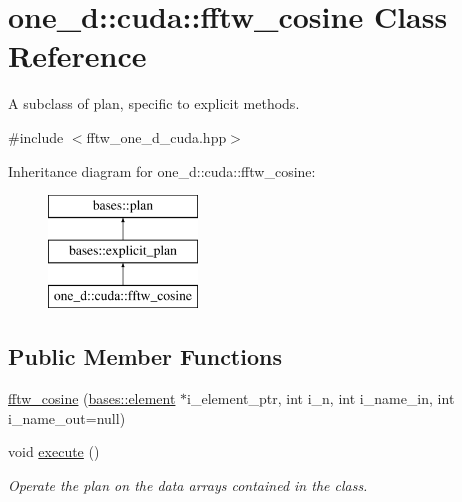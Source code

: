 \hypertarget{classone__d_1_1cuda_1_1fftw__cosine}{\section{one\-\_\-d\-:\-:cuda\-:\-:fftw\-\_\-cosine Class Reference}
\label{classone__d_1_1cuda_1_1fftw__cosine}
}


A subclass of plan, specific to explicit methods.  




{\ttfamily \#include $<$fftw\-\_\-one\-\_\-d\-\_\-cuda.\-hpp$>$}

Inheritance diagram for one\-\_\-d\-:\-:cuda\-:\-:fftw\-\_\-cosine\-:\begin{figure}[H]
\begin{center}
\leavevmode
\includegraphics[height=3.000000cm]{classone__d_1_1cuda_1_1fftw__cosine}
\end{center}
\end{figure}
\subsection*{Public Member Functions}
\begin{DoxyCompactItemize}
\item 
\hyperlink{classone__d_1_1cuda_1_1fftw__cosine_a35bf1ddd6e20eb04ab5293c461344919}{fftw\-\_\-cosine} (\hyperlink{classbases_1_1element}{bases\-::element} $\ast$i\-\_\-element\-\_\-ptr, int i\-\_\-n, int i\-\_\-name\-\_\-in, int i\-\_\-name\-\_\-out=null)
\begin{DoxyCompactList}\small\item\em \end{DoxyCompactList}\item 
void \hyperlink{classone__d_1_1cuda_1_1fftw__cosine_a557fc154a9e6ffe9a8179667b66901dc}{execute} ()
\begin{DoxyCompactList}\small\item\em Operate the plan on the data arrays contained in the class. \end{DoxyCompactList}\end{DoxyCompactItemize}
